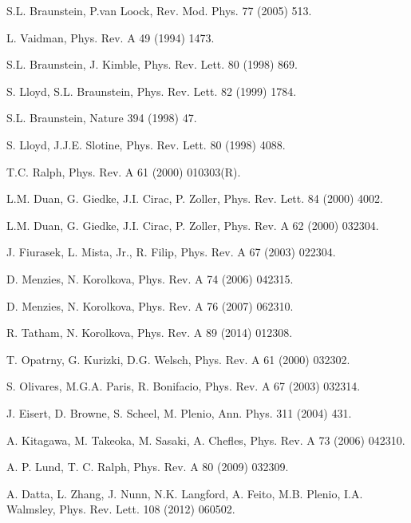 \documentclass[preprintnumbers,showkeys,amsmath,amssymb]{revtex4}%
\begin{document}
\begin{thebibliography}{1}

 S.L. Braunstein, P.van Loock, Rev. Mod. Phys. 77 (2005) 513.

 L. Vaidman, Phys. Rev. A 49 (1994) 1473.

 S.L. Braunstein, J. Kimble, Phys. Rev. Lett. 80 (1998) 869.

 S. Lloyd, S.L. Braunstein, Phys. Rev. Lett. 82 (1999) 1784.

 S.L. Braunstein, Nature 394 (1998) 47.

 S. Lloyd, J.J.E. Slotine, Phys. Rev. Lett. 80 (1998) 4088.

 T.C. Ralph, Phys. Rev. A 61 (2000) 010303(R).

 L.M. Duan, G. Giedke, J.I. Cirac, P. Zoller, Phys. Rev. Lett. 84 (2000) 4002.

 L.M. Duan, G. Giedke, J.I. Cirac, P. Zoller, Phys. Rev. A 62 (2000) 032304.

 J. Fiurasek, L. Mista, Jr., R. Filip, Phys. Rev. A 67 (2003) 022304.

 D. Menzies, N. Korolkova, Phys. Rev. A 74 (2006) 042315.

 D. Menzies, N. Korolkova, Phys. Rev. A 76 (2007) 062310.



 R. Tatham, N. Korolkova, Phys. Rev. A 89 (2014) 012308.

 T. Opatrny, G. Kurizki, D.G. Welsch, Phys. Rev. A 61 (2000) 032302.

 S. Olivares, M.G.A. Paris, R. Bonifacio, Phys. Rev. A 67 (2003) 032314.

 J. Eisert, D. Browne, S. Scheel, M. Plenio, Ann. Phys. 311 (2004) 431.

 A. Kitagawa, M. Takeoka, M. Sasaki, A. Chefles, Phys. Rev. A 73 (2006) 042310.

 A. P. Lund, T. C. Ralph, Phys. Rev. A 80 (2009) 032309.




 A. Datta, L. Zhang, J. Nunn, N.K. Langford, A. Feito, M.B. Plenio, I.A. Walmsley, Phys. Rev. Lett. 108 (2012) 060502.


\end{thebibliography}
\end{document}
